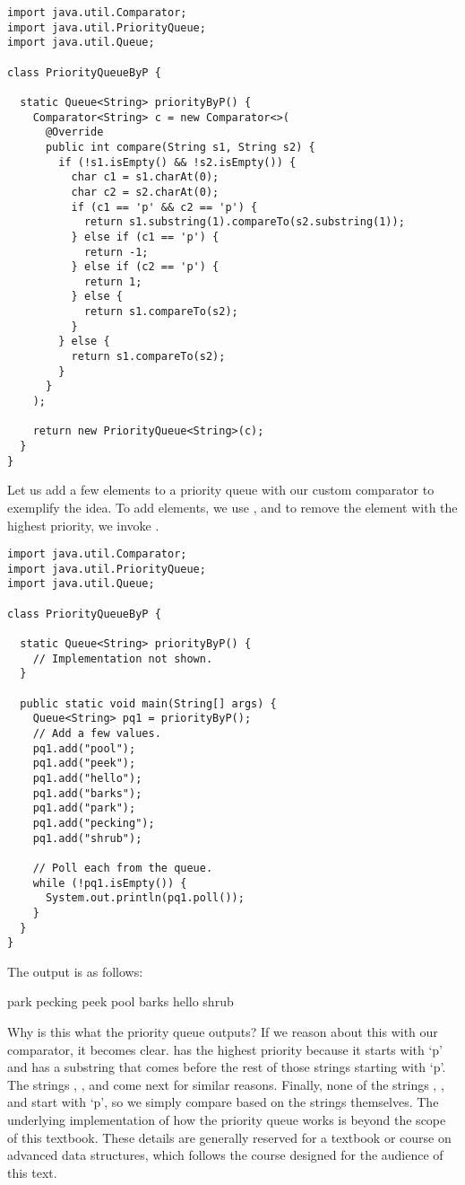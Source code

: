\begin{cl}[]{}
\begin{lstlisting}[language=MyJava]
import java.util.Comparator;
import java.util.PriorityQueue;
import java.util.Queue;

class PriorityQueueByP {

  static Queue<String> priorityByP() {
    Comparator<String> c = new Comparator<>(
      @Override
      public int compare(String s1, String s2) {
        if (!s1.isEmpty() && !s2.isEmpty()) {
          char c1 = s1.charAt(0);
          char c2 = s2.charAt(0);
          if (c1 == 'p' && c2 == 'p') {
            return s1.substring(1).compareTo(s2.substring(1));
          } else if (c1 == 'p') {
            return -1;
          } else if (c2 == 'p') {
            return 1;
          } else {
            return s1.compareTo(s2);
          }
        } else {
          return s1.compareTo(s2);
        }
      }
    );

    return new PriorityQueue<String>(c);
  }
}
\end{lstlisting}
\end{cl}

Let us add a few elements to a priority queue with our custom comparator to exemplify the idea. To add elements, we use , and to remove the element with the highest priority, we invoke .

\begin{cl}[]{}
\begin{lstlisting}[language=MyJava]
import java.util.Comparator;
import java.util.PriorityQueue;
import java.util.Queue;

class PriorityQueueByP {

  static Queue<String> priorityByP() {
    // Implementation not shown.
  }

  public static void main(String[] args) {
    Queue<String> pq1 = priorityByP();
    // Add a few values.
    pq1.add("pool");
    pq1.add("peek");
    pq1.add("hello");
    pq1.add("barks");
    pq1.add("park");
    pq1.add("pecking");
    pq1.add("shrub");

    // Poll each from the queue.
    while (!pq1.isEmpty()) {
      System.out.println(pq1.poll());
    }
  }
}
\end{lstlisting}
\end{cl}
The output is as follows:
\begin{verbnobox}[\footnotesize]
park
pecking
peek
pool
barks
hello
shrub
\end{verbnobox}
Why is this what the priority queue outputs? If we reason about this with our comparator, it becomes clear.  has the highest priority because it starts with `p' and has a substring that comes before the rest of those strings starting with `p'. The strings , , and  come next for similar reasons. Finally, none of the strings , , and  start with `p', so we simply compare based on the strings themselves. The underlying implementation of how the priority queue works is beyond the scope of this textbook. These details are generally reserved for a textbook or course on advanced data structures, which follows the course designed for the audience of this text.

